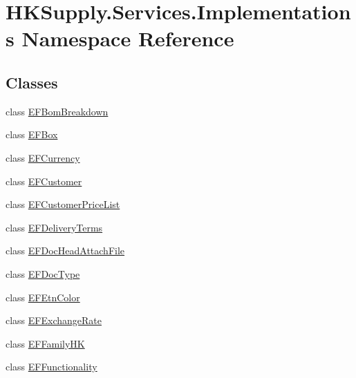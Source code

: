 \hypertarget{namespace_h_k_supply_1_1_services_1_1_implementations}{}\section{H\+K\+Supply.\+Services.\+Implementations Namespace Reference}
\label{namespace_h_k_supply_1_1_services_1_1_implementations}
\subsection*{Classes}
\begin{DoxyCompactItemize}
\item 
class \mbox{\hyperlink{class_h_k_supply_1_1_services_1_1_implementations_1_1_e_f_bom_breakdown}{E\+F\+Bom\+Breakdown}}
\item 
class \mbox{\hyperlink{class_h_k_supply_1_1_services_1_1_implementations_1_1_e_f_box}{E\+F\+Box}}
\item 
class \mbox{\hyperlink{class_h_k_supply_1_1_services_1_1_implementations_1_1_e_f_currency}{E\+F\+Currency}}
\item 
class \mbox{\hyperlink{class_h_k_supply_1_1_services_1_1_implementations_1_1_e_f_customer}{E\+F\+Customer}}
\item 
class \mbox{\hyperlink{class_h_k_supply_1_1_services_1_1_implementations_1_1_e_f_customer_price_list}{E\+F\+Customer\+Price\+List}}
\item 
class \mbox{\hyperlink{class_h_k_supply_1_1_services_1_1_implementations_1_1_e_f_delivery_terms}{E\+F\+Delivery\+Terms}}
\item 
class \mbox{\hyperlink{class_h_k_supply_1_1_services_1_1_implementations_1_1_e_f_doc_head_attach_file}{E\+F\+Doc\+Head\+Attach\+File}}
\item 
class \mbox{\hyperlink{class_h_k_supply_1_1_services_1_1_implementations_1_1_e_f_doc_type}{E\+F\+Doc\+Type}}
\item 
class \mbox{\hyperlink{class_h_k_supply_1_1_services_1_1_implementations_1_1_e_f_etn_color}{E\+F\+Etn\+Color}}
\item 
class \mbox{\hyperlink{class_h_k_supply_1_1_services_1_1_implementations_1_1_e_f_exchange_rate}{E\+F\+Exchange\+Rate}}
\item 
class \mbox{\hyperlink{class_h_k_supply_1_1_services_1_1_implementations_1_1_e_f_family_h_k}{E\+F\+Family\+HK}}
\item 
class \mbox{\hyperlink{class_h_k_supply_1_1_services_1_1_implementations_1_1_e_f_functionality}{E\+F\+Functionality}}

\end{DoxyCompactItemize}

